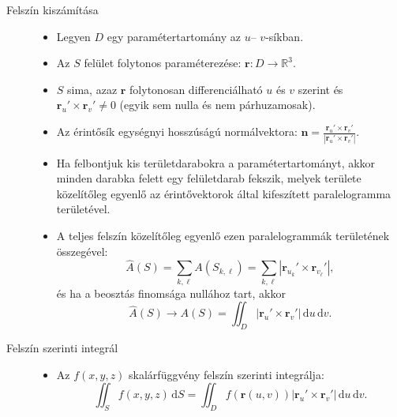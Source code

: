 \documentclass[DIV=15,appendixprefix]{scrreprt}
\theoremstyle{definition}
\theoremstyle{remark}
\begin{document}
\begin{description}
	\item[Felszín kiszámítása]\leavevmode
		\begin{itemize}
			\item Legyen $ D $ egy paramétertartomány az $ u $-- $ v $-síkban.
			\item Az $ S $ felület folytonos paraméterezése: $ \mathbf{ r } \colon D \rightarrow
			 	\mathbb{ R }^{ 3 }$.
			\item $ S $ sima, azaz $ \mathbf{ r } $ folytonosan differenciálható $ u$  és $ v $
				szerint és $ \mathbf{ r }_{ u }' \times \mathbf{r}_{ v }' \neq 0 $ (egyik sem nulla
				és nem párhuzamosak).
			\item Az érintősík egységnyi hosszúságú normálvektora: $ \mathbf{ n } =
				\frac{ \mathbf{ r }_{ u }' \times \mathbf{ r }_{ v }' }{ \left| \mathbf{ r }_{ u }'
				\times \mathbf{ r }_{ v }' \right|}$.
			\item Ha felbontjuk kis területdarabokra a paramétertartományt, akkor minden darabka
				felett egy felületdarab fekszik, melyek területe közelítőleg egyenlő az
				érintővektorok által kifeszített paralelogramma területével.
			\item A teljes felszín közelítőleg egyenlő ezen paralelogrammák területének összegével:
				\begin{equation*}
					\hat{ A } \left( S \right) = \sum_{ k,{} \ell} A \left( S_{ k,{} \ell } \right)
					= \sum_{ k,{} \ell} \left| \mathbf{r}_{ u_{ k } }' \times
					\mathbf{r}_{ v_{ \ell } }'\right|,
				\end{equation*}
				és ha a beosztás finomsága nullához tart, akkor
				\begin{equation*}
					\hat{ A } \left( S \right) \rightarrow A \left( S \right) = \iint_{ D } \left|
					\mathbf{r}_{ u }' \times \mathbf{r}_{ v }'\right| \, \mathrm{ d } u \,
					\mathrm{ d } v.
				\end{equation*}
		\end{itemize}
	\item[Felszín szerinti integrál]\leavevmode
		\begin{itemize}
			\item Az $ f \left( x,{} y,{} z \right) $ skalárfüggvény felszín szerinti integrálja:
				\begin{equation*}
					\iint_{ S } f \left( x,{} y,{} z \right) \, \mathrm{ d } S = \iint_{ D } f
					\left( \mathbf{ r } \left( u,{} v \right) \right) \left| \mathbf{r}_{ u }'
					\times \mathbf{r}_{ v }'\right| \, \mathrm{ d } u \, \mathrm{ d } v.

\end{equation*}
\end{itemize}
\end{description}
\end{document}
